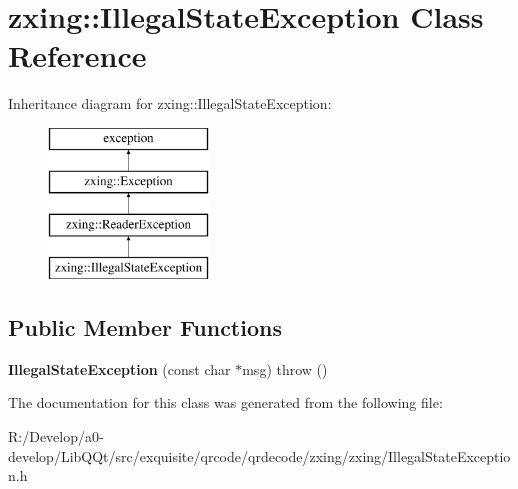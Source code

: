 \hypertarget{classzxing_1_1_illegal_state_exception}{}\section{zxing\+:\+:Illegal\+State\+Exception Class Reference}
\label{classzxing_1_1_illegal_state_exception}
Inheritance diagram for zxing\+:\+:Illegal\+State\+Exception\+:\begin{figure}[H]
\begin{center}
\leavevmode
\includegraphics[height=4.000000cm]{classzxing_1_1_illegal_state_exception}
\end{center}
\end{figure}
\subsection*{Public Member Functions}
\begin{DoxyCompactItemize}
\item 
\mbox{\label{classzxing_1_1_illegal_state_exception_a5bc42c29a607f5221a91d30017af168d}} 
{\bfseries Illegal\+State\+Exception} (const char $\ast$msg)  throw ()
\end{DoxyCompactItemize}


The documentation for this class was generated from the following file\+:\begin{DoxyCompactItemize}
\item 
R\+:/\+Develop/a0-\/develop/\+Lib\+Q\+Qt/src/exquisite/qrcode/qrdecode/zxing/zxing/Illegal\+State\+Exception.\+h\end{DoxyCompactItemize}
